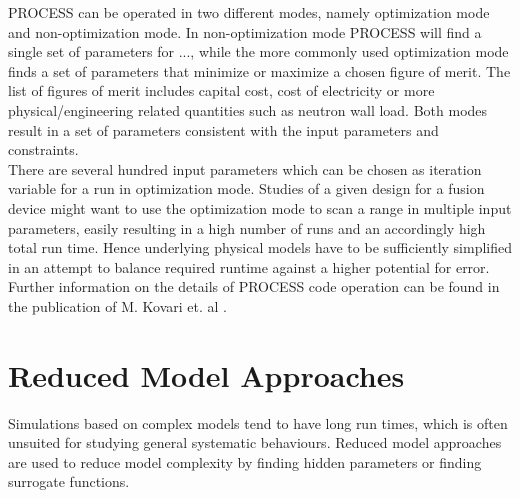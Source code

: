 	PROCESS can be operated in two different modes, namely optimization mode and non-optimization mode. In non-optimization mode PROCESS will find a single set of parameters for ..., while the more commonly used optimization mode finds a set of parameters that minimize or maximize a chosen figure of merit. The list of figures of merit includes capital cost, cost of electricity or more physical/engineering related quantities such as neutron wall load. Both modes result in a set of parameters consistent with the input parameters and constraints.\\ %
	There are several hundred input parameters which can be chosen as iteration variable for a run in optimization mode. Studies of a given design for a fusion device might want to use the optimization mode to scan a range in multiple input parameters, easily resulting in a high number of runs and an accordingly high total run time. Hence underlying physical models have to be sufficiently simplified in an attempt to balance required runtime against a higher potential for error.\\
	
	Further information on the details of PROCESS code operation can be found in the publication of M. Kovari et. al \cite{process}.\\
	
	\section{Reduced Model Approaches}
	Simulations based on complex models tend to have long run times, which is often unsuited for studying general systematic behaviours. Reduced model approaches are used to reduce model complexity by finding hidden parameters or finding surrogate functions.

	
	